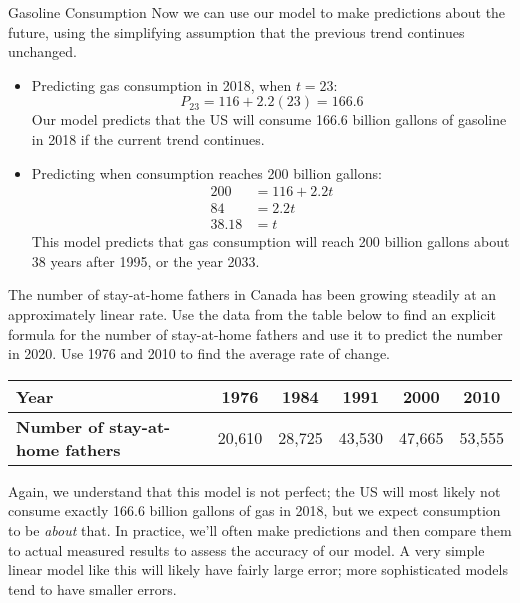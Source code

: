 \begin{example}[https://www.youtube.com/watch?v=QoOdfeLBN0o]{Gasoline Consumption}
Now we can use our model to make predictions about the future, using the simplifying assumption that the previous trend continues unchanged.
\begin{itemize}
\item Predicting gas consumption in 2018, when $t=23$:
\[P_{23} = 116 + 2.2(23) = 166.6\]
Our model predicts that the US will consume 166.6 billion gallons of gasoline in 2018 if the current trend continues.

\item Predicting when consumption reaches 200 billion gallons:
\begin{align*}
200 &= 116 + 2.2t\\
84 &= 2.2t\\
38.18 &= t
\end{align*}
This model predicts that gas consumption will reach 200 billion gallons about 38 years after 1995, or the year 2033.
\end{itemize}
\end{example}

\begin{try}
The number of stay-at-home fathers in Canada has been growing steadily at an approximately linear rate.  Use the data from the table below to find an explicit formula for the number of stay-at-home fathers and use it to predict the number in 2020.  Use 1976 and 2010 to find the average rate of change.
\begin{center}
\begin{tabular}{|p{1.25in} | c | c | c | c | c|}
\hline
\textbf{Year} & 1976 & 1984 & 1991 & 2000 & 2010\\
\hline
\textbf{Number of stay-at-home fathers} & 20,610 & 28,725 & 43,530 & 47,665 & 53,555\\
\hline
\end{tabular}
\end{center}
\end{try}

Again, we understand that this model is not perfect; the US will most likely not consume exactly 166.6 billion gallons of gas in 2018, but we expect consumption to be \textit{about} that.  In practice, we'll often make predictions and then compare them to actual measured results to assess the accuracy of our model.  A very simple linear model like this will likely have fairly large error; more sophisticated models tend to have smaller errors.

